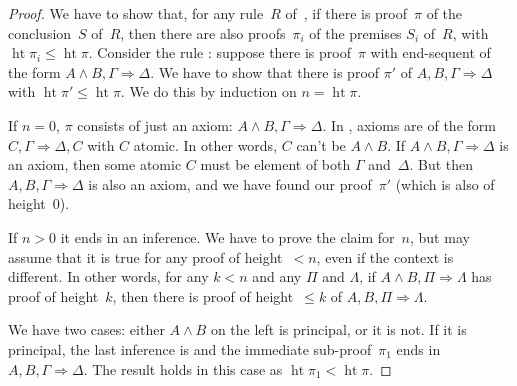 \documentclass[10pt,a4paper]{article}
\newcommand*{\olup}[1]{#1}   %
\theoremstyle{plain}
\theoremstyle{definition}
\theoremstyle{remark}
\providecommand{\Sequent}{\mathrel{\Rightarrow}}
\providecommand{\formula}{\relax}
\providecommand{\LeftR}[1]{}
\providecommand{\pheight}{\operatorname{ht}}
\providecommand{\LeftR}{\ifmmode\mathrm{L}\else L\fi}
\providecommand{\formula}[1]{#1}
\renewcommand{\olup}[1]{#1}
\begin{document}
\begin{proof}
We have to show that, for any rule~$R$ of~, if there is
\olup{proof}~$\pi$ of the conclusion~$S$ of~$R$, then there are also
\olup{proof}s~$\pi_i$ of the premises $S_i$ of~$R$, with $\pheight{\pi_i}
\le \pheight{\pi}$. Consider the rule \LeftR{\land}: suppose there is
\olup{proof}~$\pi$ with end-sequent of the form $A \land B, \Gamma
\Sequent \Delta$. We have to show that there is \olup{proof} $\pi'$ of
$A, B, \Gamma \Sequent \Delta$ with $\pheight{\pi'} \le
\pheight{\pi}$. We do this by induction on $n = \pheight{\pi}$.

If $n = 0$, $\pi$ consists of just an axiom: $A \land B, \Gamma
\Sequent \Delta$. In , axioms are of the form $C, \Gamma
\Sequent \Delta, C$ with $C$ atomic. In other words, $C$ can't be
$A \land B$. If $A \land B, \Gamma \Sequent \Delta$ is an axiom,
then some atomic $C$ must be \olup{element} of both $\Gamma$
and~$\Delta$. But then $A, B, \Gamma \Sequent \Delta$ is also an
axiom, and we have found our \olup{proof}~$\pi'$ (which is also of
\olup{height}~$0$).

If $n>0$ it ends in an inference. We have to prove the claim for~$n$,
but may assume that it is true for any \olup{proof} of height~$<n$, even
if the context is different. In other words, for any $k<n$ and any
$\Pi$ and $\Lambda$, if $A \land B, \Pi \Sequent \Lambda$ has
\olup{proof} of \olup{height}~$k$, then there is \olup{proof} of
\olup{height}~$\le k$ of $A, B, \Pi \Sequent \Lambda$.

We have two cases: either $A \land
B$ on the left is principal, or it is not. If it is principal, the
last inference is \LeftR{\land} and the immediate
sub-\olup{proof}~$\pi_1$ ends in $A, B, \Gamma \Sequent \Delta$. The
result holds in this case as $\pheight{\pi_1} < \pheight{\pi}$.


\end{proof}
\end{document}
